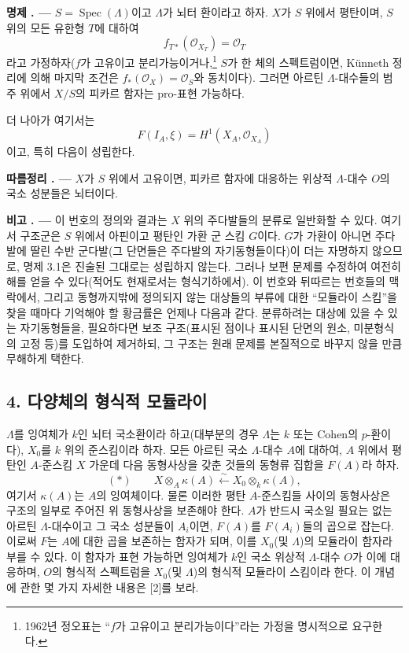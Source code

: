 \documentclass[11pt,twoside,openany]{book}
\numberwithin{equation}{section}
\newcommand{\sourceunit}{front}
\newcommand{\src}[1]{%
  \phantomsection\hypertarget{src:\sourceunit:#1}{}%
  \marginpar{\raggedleft\footnotesize\sffamily #1}%
}
\theoremstyle{plain}
\theoremstyle{definition}
\theoremstyle{remark}
\newcommand{\result}[2]{%
  \par\medskip\noindent\textbf{#1%
  \if\relax\detokenize{#2}\relax\else\space#2\fi. ---}\enspace
}
\begin{document}
\src{384}
\result{명제}{3.1} $S=\operatorname{Spec}(\Lambda)$이고 $\Lambda$가
뇌터 환이라고 하자. $X$가 $S$ 위에서 평탄이며, $S$ 위의 모든 유한형
$T$에 대하여
\[
  f_{T*}(\mathcal O_{X_T})=\mathcal O_T
\]
라고 가정하자($f$가 고유이고 분리가능이거나,\footnote{1962년 정오표는
``$f$가 고유이고 분리가능이다''라는 가정을 명시적으로 요구한다.} $S$가
한 체의 스펙트럼이면, K\"unneth 정리에 의해 마지막 조건은
$f_*(\mathcal O_X)=\mathcal O_S$와 동치이다). 그러면 아르틴
$\Lambda$-대수들의 범주 위에서 $X/S$의 피카르 함자는 pro-표현 가능하다.

더 나아가 여기서는
\[
  F(I_A,\xi)=H^1(X_A,\mathcal O_{X_A})
\]
이고, 특히 다음이 성립한다.

\result{따름정리}{} $X$가 $S$ 위에서 고유이면, 피카르 함자에 대응하는
위상적 $\Lambda$-대수 $O$의 국소 성분들은 뇌터이다.

\result{비고}{} 이 번호의 정의와 결과는 $X$ 위의 주다발들의 분류로
일반화할 수 있다. 여기서 구조군은 $S$ 위에서 아핀이고 평탄인 가환 군
스킴 $G$이다. $G$가 가환이 아니면 주다발에 딸린 수반 군다발(그 단면들은
주다발의 자기동형들이다)이 더는 자명하지 않으므로, 명제 3.1은 진술된
그대로는 성립하지 않는다. 그러나 보편 문제를 수정하여 여전히 해를 얻을
수 있다(적어도 현재로서는 형식기하에서). 이 번호와 뒤따르는 번호들의
맥락에서, 그리고 동형까지밖에 정의되지 않는 대상들의 부류에 대한
``모듈라이 스킴''을 찾을 때마다 기억해야 할 황금률은 언제나 다음과 같다.
분류하려는 대상에 있을 수 있는 자기동형들을, 필요하다면 보조 구조(표시된
점이나 표시된 단면의 원소, 미분형식의 고정 등)를 도입하여 제거하되, 그
구조는 원래 문제를 본질적으로 바꾸지 않을 만큼 무해하게 택한다.

\subsection*{4. 다양체의 형식적 모듈라이}

$\Lambda$를 잉여체가 $k$인 뇌터 국소환이라 하고(대부분의 경우
$\Lambda$는 $k$ 또는 Cohen의 $p$-환이다), $X_0$를 $k$ 위의 준스킴이라
하자. 모든 아르틴 국소 $\Lambda$-대수 $A$에 대하여, $A$ 위에서 평탄인
$A$-준스킴 $X$ 가운데 다음 동형사상을 갖춘 것들의 동형류 집합을 $F(A)$라
하자.
\[
  (*)\qquad
  X\otimes_A\kappa(A)\xleftarrow{\sim}
  X_0\otimes_k\kappa(A),
\]
여기서 $\kappa(A)$는 $A$의 잉여체이다. 물론 이러한 평탄
$A$-준스킴들 사이의 동형사상은 구조의 일부로 주어진 위 동형사상을
보존해야 한다. $A$가 반드시 국소일 필요는 없는 아르틴
$\Lambda$-대수이고 그 국소 성분들이 $A_i$이면, $F(A)$를 $F(A_i)$들의
곱으로 잡는다. 이로써 $F$는 $A$에 대한 곱을 보존하는 함자가 되며, 이를
$X_0$(및 $\Lambda$)의 모듈라이 함자라 부를 수 있다. 이 함자가 표현
가능하면 잉여체가 $k$인 국소 위상적 $\Lambda$-대수 $O$가 이에 대응하며,
$O$의 형식적 스펙트럼을 $X_0$(및 $\Lambda$)의 형식적 모듈라이 스킴이라
한다. 이 개념에 관한 몇 가지 자세한 내용은 [2]를 보라.
\end{document}
